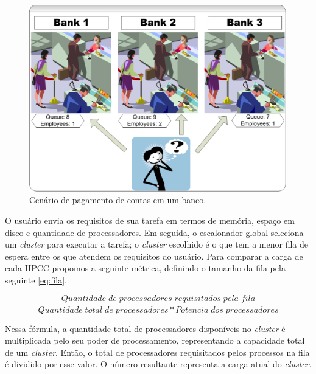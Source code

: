 \documentclass[12pt]{report} %
\begin{document}
	    \begin{figure}[!htb]%
		\begin{center}
		    \includegraphics[scale=0.35]{imagens/banco.pdf}
		    \caption{Cenário de pagamento de contas em um banco.}
		    \label{fig:CenarioBanco}
		\end{center}
	    \end{figure}

	    O usuário envia os requisitos de sua tarefa em termos de memória, espaço em disco e quantidade de processadores.
	    Em seguida, o escalonador global seleciona um \textit{cluster} para executar a tarefa; o \textit{cluster} escolhido é o que tem a menor fila de espera entre os que atendem os requisitos do usuário.
	    Para comparar a carga de cada HPCC propomos a seguinte métrica, definindo o tamanho da fila pela seguinte \autoref{eq:fila}.

	    \begin{equation}
		\frac{Quantidade\; de\; processadores\; requisitados\; pela\; fila}{Quantidade\; total\; de\;  processadores * Potencia\; dos\; processadores}
		\label{eq:fila}
	    \end{equation}

	    Nessa fórmula, a quantidade total de processadores disponíveis no \textit{cluster} é multiplicada pelo seu poder de processamento, representando a capacidade total de um \textit{cluster}.
	    Então, o total de processadores requisitados pelos processos na fila é dividido por esse valor.
	    O número resultante representa a carga atual do \textit{cluster}.
\end{document}
